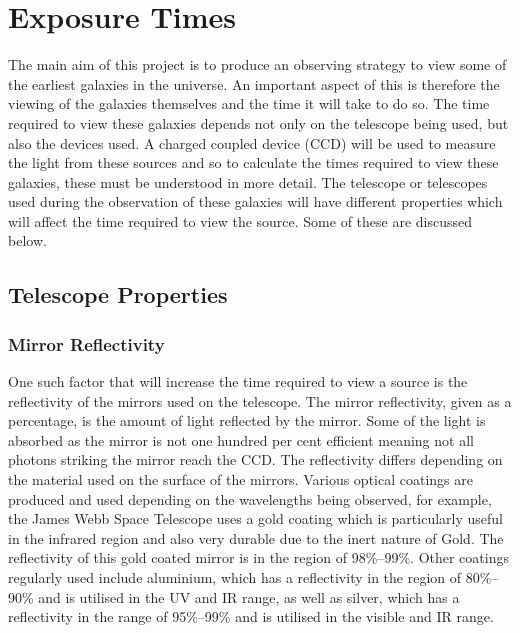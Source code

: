 
\section{Exposure Times} %
\label{sec:exposure_times}
	The main aim of this project is to produce an observing strategy to view some of the earliest galaxies in the universe. An important aspect of this is therefore the viewing of the galaxies themselves and the time it will take to do so. The time required to view these galaxies depends not only on the telescope being used, but also the devices used. A charged coupled device (CCD) will be used to measure the light from these sources and so to calculate the times required to view these galaxies, these must be understood in more detail. The telescope or telescopes used during the observation of these galaxies will have different properties which will affect the time required to view the source. Some of these are discussed below.

	\subsection{Telescope Properties} %
	\label{sub:telescope_properties}

		\subsubsection{Mirror Reflectivity} %
		\label{ssub:mirror_reflectivity}
			One such factor that will increase the time required to view a source is the reflectivity of the mirrors used on the telescope. The mirror reflectivity, given as a percentage, is the amount of light reflected by the mirror. Some of the light is absorbed as the mirror is not one hundred per cent efficient meaning not all photons striking the mirror reach the CCD. The reflectivity differs depending on the material used on the surface of the mirrors. Various optical coatings are produced and used depending on the wavelengths being observed, for example, the James Webb Space Telescope uses a gold coating which is particularly useful in the infrared region and also very durable due to the inert nature of Gold. The reflectivity of this gold coated mirror is in the region of 98\%--99\%\cite{Quantum_Coatings_Incorporated}. Other coatings regularly used include aluminium, which has a reflectivity in the region of 80\%--90\% and is utilised in the UV and IR range, as well as silver, which has a reflectivity in the range of 95\%--99\% and is utilised in the visible and IR range.

